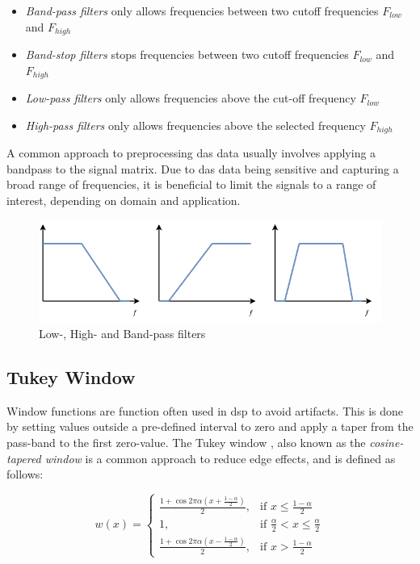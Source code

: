 \begin{itemize}
    \item \textit{Band-pass filters} only allows frequencies between two cutoff frequencies $F_{low}$ and $F_{high}$
    \item \textit{Band-stop filters} stops frequencies between two cutoff frequencies $F_{low}$ and $F_{high}$
    \item \textit{Low-pass filters} only allows frequencies above the cut-off frequency $F_{low}$
    \item \textit{High-pass filters} only allows frequencies above the selected frequency $F_{high}$
\end{itemize}

A common approach to preprocessing \acrshort{das} data usually involves applying a bandpass to the signal matrix. Due to \acrshort{das} data being sensitive and capturing a broad range of frequencies, it is beneficial to limit the signals to a range of interest, depending on domain and application.

\vspace{0.5cm}

\begin{figure}[!h]
    \centering
    \includegraphics[width=0.8\linewidth]{figures/lowhighpass.png}
    \caption{Low-, High- and Band-pass filters}
    \label{fig:rffilters}
\end{figure}


\subsection{Tukey Window}
\label{dsp:tukey}

Window functions are function often used in \acrshort{dsp} to avoid artifacts. This is done by setting values outside a pre-defined interval to zero and apply a taper from the pass-band to the first zero-value. The Tukey window \cite{tukey1967introduction}, also known as the \textit{cosine-tapered window} is a common approach to reduce edge effects, and is defined as follows:

\[
    w(x)= 
\begin{cases}
    \frac{1 + \cos{2 \pi \alpha (x + \frac{1-\alpha}{2})}}{2}, & \text{if } x \leq \frac{1-\alpha}{2}\\
    1,              & \text{if } \frac{\alpha}{2} < x \leq \frac{\alpha}{2}\\
    \frac{1 + \cos{2 \pi \alpha (x - \frac{1-\alpha}{2})}}{2}, & \text{if } x > \frac{1-\alpha}{2}
\end{cases}
\]

